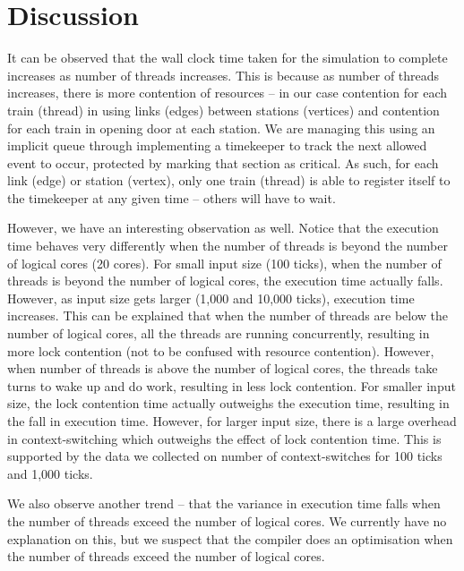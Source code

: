\documentclass[a4paper,12pt]{article}
\begin{document}
\section{Discussion}
It can be observed that the wall clock time taken for the simulation to complete increases as number of threads increases. This is because as number of threads increases, there is more contention of resources -- in our case contention for each train (thread) in using links (edges) between stations (vertices) and contention for each train in opening door at each station. We are managing this using an implicit queue through implementing a timekeeper to track the next allowed event to occur, protected by marking that section as critical. As such, for each link (edge) or station (vertex), only one train (thread) is able to register itself to the timekeeper at any given time -- others will have to wait.

However, we have an interesting observation as well. Notice that the execution time behaves very differently when the number of threads is beyond the number of logical cores (20 cores). For small input size (100 ticks), when the number of threads is beyond the number of logical cores, the execution time actually falls. However, as input size gets larger (1,000 and 10,000 ticks), execution time increases. This can be explained that when the number of threads are below the number of logical cores, all the threads are running concurrently, resulting in more lock contention (not to be confused with resource contention). However, when number of threads is above the number of logical cores, the threads take turns to wake up and do work, resulting in less lock contention. For smaller input size, the lock contention time actually outweighs the execution time, resulting in the fall in execution time. However, for larger input size, there is a large overhead in context-switching which outweighs the effect of lock contention time. This is supported by the data we collected on number of context-switches for 100 ticks and 1,000 ticks.

We also observe another trend -- that the variance in execution time falls when the number of threads exceed the number of logical cores. We currently have no explanation on this, but we suspect that the compiler does an optimisation when the number of threads exceed the number of logical cores.
\end{document}
